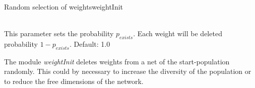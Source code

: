 \begin{moduledoc}{Random selection of weights}{weightInit}
  \item[\KeyWord{weightProb} \optParam{ x } ]~\\
    This parameter sets the probability $p_{exists}$. Each weight will
    be deleted probability $1 - p_{exists}$.
    Default: 1.0
\end{moduledoc}
The module {\it weightInit} deletes weights from a net of the start-population randomly. 
This could by necessary to increase the diversity of the population or to reduce the
free dimensions of the network.

